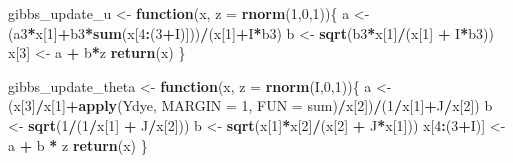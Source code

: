 \documentclass[
]{article}
\newenvironment{Shaded}{\begin{snugshade}}{\end{snugshade}}
\newcommand{\AttributeTok}[1]{\textcolor[rgb]{0.13,0.29,0.53}{#1}}
\newcommand{\ControlFlowTok}[1]{\textcolor[rgb]{0.13,0.29,0.53}{\textbf{#1}}}
\newcommand{\DecValTok}[1]{\textcolor[rgb]{0.00,0.00,0.81}{#1}}
\newcommand{\FunctionTok}[1]{\textcolor[rgb]{0.13,0.29,0.53}{\textbf{#1}}}
\newcommand{\NormalTok}[1]{#1}
\newcommand{\OtherTok}[1]{\textcolor[rgb]{0.56,0.35,0.01}{#1}}
\newcommand{\SpecialCharTok}[1]{\textcolor[rgb]{0.81,0.36,0.00}{\textbf{#1}}}
\begin{document}
\begin{Shaded}
\begin{Highlighting}[]
\NormalTok{gibbs\_update\_u }\OtherTok{\textless{}{-}} \ControlFlowTok{function}\NormalTok{(x, }\AttributeTok{z =} \FunctionTok{rnorm}\NormalTok{(}\DecValTok{1}\NormalTok{,}\DecValTok{0}\NormalTok{,}\DecValTok{1}\NormalTok{))\{}
\NormalTok{  a }\OtherTok{\textless{}{-}}\NormalTok{ (a3}\SpecialCharTok{*}\NormalTok{x[}\DecValTok{1}\NormalTok{]}\SpecialCharTok{+}\NormalTok{b3}\SpecialCharTok{*}\FunctionTok{sum}\NormalTok{(x[}\DecValTok{4}\SpecialCharTok{:}\NormalTok{(}\DecValTok{3}\SpecialCharTok{+}\NormalTok{I)]))}\SpecialCharTok{/}\NormalTok{(x[}\DecValTok{1}\NormalTok{]}\SpecialCharTok{+}\NormalTok{I}\SpecialCharTok{*}\NormalTok{b3)}
\NormalTok{  b }\OtherTok{\textless{}{-}} \FunctionTok{sqrt}\NormalTok{(b3}\SpecialCharTok{*}\NormalTok{x[}\DecValTok{1}\NormalTok{]}\SpecialCharTok{/}\NormalTok{(x[}\DecValTok{1}\NormalTok{] }\SpecialCharTok{+}\NormalTok{ I}\SpecialCharTok{*}\NormalTok{b3))}
\NormalTok{  x[}\DecValTok{3}\NormalTok{] }\OtherTok{\textless{}{-}}\NormalTok{ a }\SpecialCharTok{+}\NormalTok{ b}\SpecialCharTok{*}\NormalTok{z}
  \FunctionTok{return}\NormalTok{(x)}
\NormalTok{\}}

\NormalTok{gibbs\_update\_theta }\OtherTok{\textless{}{-}} \ControlFlowTok{function}\NormalTok{(x, }\AttributeTok{z =} \FunctionTok{rnorm}\NormalTok{(I,}\DecValTok{0}\NormalTok{,}\DecValTok{1}\NormalTok{))\{}
\NormalTok{  a }\OtherTok{\textless{}{-}}\NormalTok{ (x[}\DecValTok{3}\NormalTok{]}\SpecialCharTok{/}\NormalTok{x[}\DecValTok{1}\NormalTok{]}\SpecialCharTok{+}\FunctionTok{apply}\NormalTok{(Ydye, }\AttributeTok{MARGIN =} \DecValTok{1}\NormalTok{, }\AttributeTok{FUN =}\NormalTok{ sum)}\SpecialCharTok{/}\NormalTok{x[}\DecValTok{2}\NormalTok{])}\SpecialCharTok{/}\NormalTok{(}\DecValTok{1}\SpecialCharTok{/}\NormalTok{x[}\DecValTok{1}\NormalTok{]}\SpecialCharTok{+}\NormalTok{J}\SpecialCharTok{/}\NormalTok{x[}\DecValTok{2}\NormalTok{])}
\NormalTok{  b }\OtherTok{\textless{}{-}} \FunctionTok{sqrt}\NormalTok{(}\DecValTok{1}\SpecialCharTok{/}\NormalTok{(}\DecValTok{1}\SpecialCharTok{/}\NormalTok{x[}\DecValTok{1}\NormalTok{] }\SpecialCharTok{+}\NormalTok{ J}\SpecialCharTok{/}\NormalTok{x[}\DecValTok{2}\NormalTok{]))}
\NormalTok{  b }\OtherTok{\textless{}{-}} \FunctionTok{sqrt}\NormalTok{(x[}\DecValTok{1}\NormalTok{]}\SpecialCharTok{*}\NormalTok{x[}\DecValTok{2}\NormalTok{]}\SpecialCharTok{/}\NormalTok{(x[}\DecValTok{2}\NormalTok{] }\SpecialCharTok{+}\NormalTok{ J}\SpecialCharTok{*}\NormalTok{x[}\DecValTok{1}\NormalTok{]))}
\NormalTok{  x[}\DecValTok{4}\SpecialCharTok{:}\NormalTok{(}\DecValTok{3}\SpecialCharTok{+}\NormalTok{I)]  }\OtherTok{\textless{}{-}}\NormalTok{ a }\SpecialCharTok{+}\NormalTok{ b }\SpecialCharTok{*}\NormalTok{ z}
  \FunctionTok{return}\NormalTok{(x)}
\NormalTok{\}}


\end{Highlighting}
\end{Shaded}
\end{document}
